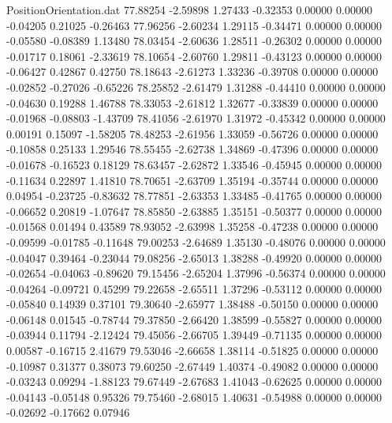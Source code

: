 \begin{filecontents}{PositionOrientation.dat}
  77.88254   -2.59898    1.27433    -0.32353    0.00000    0.00000   -0.04205    0.21025   -0.26463
  77.96256   -2.60234    1.29115    -0.34471    0.00000    0.00000   -0.05580   -0.08389    1.13480
  78.03454   -2.60636    1.28511    -0.26302    0.00000    0.00000   -0.01717    0.18061   -2.33619
  78.10654   -2.60760    1.29811    -0.43123    0.00000    0.00000   -0.06427    0.42867    0.42750
  78.18643   -2.61273    1.33236    -0.39708    0.00000    0.00000   -0.02852   -0.27026   -0.65226
  78.25852   -2.61479    1.31288    -0.44410    0.00000    0.00000   -0.04630    0.19288    1.46788
  78.33053   -2.61812    1.32677    -0.33839    0.00000    0.00000   -0.01968   -0.08803   -1.43709
  78.41056   -2.61970    1.31972    -0.45342    0.00000    0.00000    0.00191    0.15097   -1.58205
  78.48253   -2.61956    1.33059    -0.56726    0.00000    0.00000   -0.10858    0.25133    1.29546
  78.55455   -2.62738    1.34869    -0.47396    0.00000    0.00000   -0.01678   -0.16523    0.18129
  78.63457   -2.62872    1.33546    -0.45945    0.00000    0.00000   -0.11634    0.22897    1.41810
  78.70651   -2.63709    1.35194    -0.35744    0.00000    0.00000    0.04954   -0.23725   -0.83632
  78.77851   -2.63353    1.33485    -0.41765    0.00000    0.00000   -0.06652    0.20819   -1.07647
  78.85850   -2.63885    1.35151    -0.50377    0.00000    0.00000   -0.01568    0.01494    0.43589
  78.93052   -2.63998    1.35258    -0.47238    0.00000    0.00000   -0.09599   -0.01785   -0.11648
  79.00253   -2.64689    1.35130    -0.48076    0.00000    0.00000   -0.04047    0.39464   -0.23044
  79.08256   -2.65013    1.38288    -0.49920    0.00000    0.00000   -0.02654   -0.04063   -0.89620
  79.15456   -2.65204    1.37996    -0.56374    0.00000    0.00000   -0.04264   -0.09721    0.45299
  79.22658   -2.65511    1.37296    -0.53112    0.00000    0.00000   -0.05840    0.14939    0.37101
  79.30640   -2.65977    1.38488    -0.50150    0.00000    0.00000   -0.06148    0.01545   -0.78744
  79.37850   -2.66420    1.38599    -0.55827    0.00000    0.00000   -0.03944    0.11794   -2.12424
  79.45056   -2.66705    1.39449    -0.71135    0.00000    0.00000    0.00587   -0.16715    2.41679
  79.53046   -2.66658    1.38114    -0.51825    0.00000    0.00000   -0.10987    0.31377    0.38073
  79.60250   -2.67449    1.40374    -0.49082    0.00000    0.00000   -0.03243    0.09294   -1.88123
  79.67449   -2.67683    1.41043    -0.62625    0.00000    0.00000   -0.04143   -0.05148    0.95326
  79.75460   -2.68015    1.40631    -0.54988    0.00000    0.00000   -0.02692   -0.17662    0.07946

\end{filecontents}
